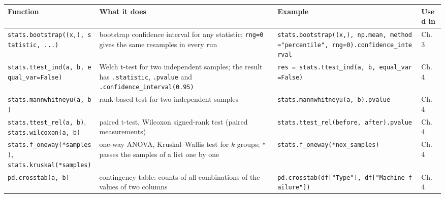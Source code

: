 \documentclass[
  letterpaper,
  DIV=11,
  numbers=noendperiod]{scrreprt}
\begin{document}
\begin{longtable}[]{@{}
  >{\raggedright\arraybackslash}p{}
  >{\raggedright\arraybackslash}p{}
  >{\raggedright\arraybackslash}p{}
  >{\raggedright\arraybackslash}p{}@{}}
\toprule\noalign{}
\begin{minipage}[b]{\linewidth}\raggedright
Function
\end{minipage} & \begin{minipage}[b]{\linewidth}\raggedright
What it does
\end{minipage} & \begin{minipage}[b]{\linewidth}\raggedright
Example
\end{minipage} & \begin{minipage}[b]{\linewidth}\raggedright
Used in
\end{minipage} \\
\midrule\noalign{}
\endhead
\bottomrule\noalign{}
\endlastfoot
\texttt{stats.bootstrap((x,),\ statistic,\ ...)} & bootstrap confidence
interval for any statistic; \texttt{rng=0} gives the same resamples in
every run &
\texttt{stats.bootstrap((x,),\ np.mean,\ method="percentile",\ rng=0).confidence\_interval}
& Ch. 3 \\
\texttt{stats.ttest\_ind(a,\ b,\ equal\_var=False)} & Welch t-test for
two independent samples; the result has \texttt{.statistic},
\texttt{.pvalue} and \texttt{.confidence\_interval(0.95)} &
\texttt{res\ =\ stats.ttest\_ind(a,\ b,\ equal\_var=False)} & Ch. 4 \\
\texttt{stats.mannwhitneyu(a,\ b)} & rank-based test for two independent
samples & \texttt{stats.mannwhitneyu(a,\ b).pvalue} & Ch. 4 \\
\texttt{stats.ttest\_rel(a,\ b)}, \texttt{stats.wilcoxon(a,\ b)} &
paired t-test, Wilcoxon signed-rank test (paired measurements) &
\texttt{stats.ttest\_rel(before,\ after).pvalue} & Ch. 4 \\
\texttt{stats.f\_oneway(*samples)}, \texttt{stats.kruskal(*samples)} &
one-way ANOVA, Kruskal--Wallis test for \(k\) groups; \texttt{*} passes
the samples of a list one by one &
\texttt{stats.f\_oneway(*nox\_samples)} & Ch. 4 \\
\texttt{pd.crosstab(a,\ b)} & contingency table: counts of all
combinations of the values of two columns &
\texttt{pd.crosstab(df{[}"Type"{]},\ df{[}"Machine\ failure"{]})} & Ch.
4 \\

\end{longtable}
\end{document}
